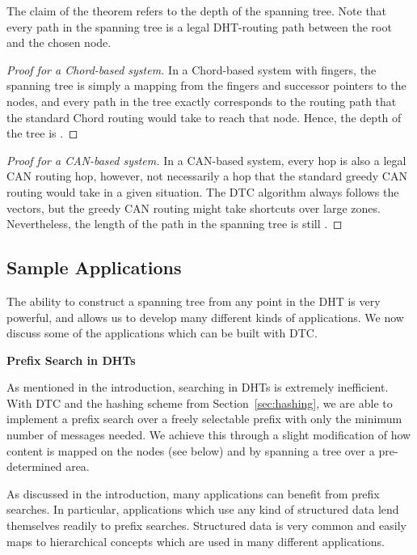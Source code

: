 \documentclass[fleqn,12pt,twoside]{article}
\begin{document}
The claim of the theorem refers to the depth of the spanning tree.
Note that every path in the spanning tree is a legal DHT-routing path
between the root and the chosen node.


\begin{proof}[Proof for a Chord-based system]
  In a Chord-based system with fingers, the spanning tree is simply a
  mapping from the fingers and successor pointers to the nodes, and
  every path in the tree exactly corresponds to the routing path that the 
  standard Chord routing would take to reach that node. Hence, the
  depth of the tree is .
\end{proof}

\begin{proof}[Proof for a CAN-based system]
  In a CAN-based system, every hop is also a legal CAN routing hop,
  however, not necessarily a hop that the standard greedy CAN routing
  would take in a given situation. The DTC algorithm always follows the
  vectors, but the greedy CAN routing might take shortcuts over large
  zones.  Nevertheless, the length of the path in the spanning tree is
  still .
\end{proof}


\subsection{Sample Applications}
\label{sec:sample-applications}

The ability to construct a spanning tree from any point in the DHT is
very powerful, and allows us to develop many different kinds of
applications. We now discuss some of the applications which can be
built with DTC.

\noindent
\textbf{Prefix Search in DHTs}

As mentioned in the introduction, searching in DHTs is extremely
inefficient. With DTC and the hashing scheme from
Section~\ref{sec:hashing}, we are able to implement a prefix search
over a freely selectable prefix with only the minimum number of
messages needed. We achieve this through a slight modification of how
content is mapped on the nodes (see below) and by spanning a tree over
a pre-determined area.

As discussed in the introduction, many applications can benefit from
prefix searches. In particular, applications which use any kind of
structured data lend themselves readily to prefix searches. Structured
data is very common and easily maps to hierarchical concepts which are
used in many different applications.
\end{document}
